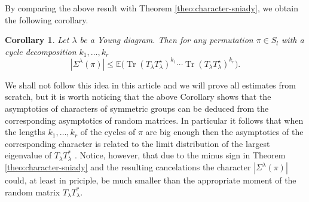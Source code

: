 \documentclass[12pt]{amsart}
\theoremstyle{plain}
\newtheorem{corollary}[lemma]{Corollary}
\theoremstyle{remark}
\newcommand{\E}{\mathbb{E}}
\newcommand{\gwia}{^\ast}
\DeclareMathOperator{\Tr}{Tr}
\begin{document}
By comparing the above result with Theorem \ref{theo:character-sniady}, we
obtain the following corollary.
\begin{corollary}
Let $\lambda$ be a Young diagram. 
Then for any permutation $\pi\in S_l$ with a cycle decomposition $k_1,\dots,k_r$
 $$|\Sigma^{\lambda}(\pi)| \leq  \E\big(\Tr(T_\lambda T_\lambda^\star)^{k_1}
\cdots \Tr(T_\lambda
T_\lambda^\star)^{k_r} \big).$$
\end{corollary}
We shall not follow this idea in this article and we will prove all estimates
from scratch, but it is worth noticing that the above Corollary shows that
the asymptotics of characters of symmetric groups can be deduced from the
corresponding asymptotics of random matrices. In particular it follows  that 
when the lengths $k_1,\dots,k_r$ of the cycles of $\pi$ are big enough then the
asymptotics of the corresponding character is related to the limit distribution
of the largest eigenvalue of $T_{\lambda}T\gwia_{\lambda}$
\cite{SinaiSoshnikov1998}. Notice, however, that due to the minus sign in
Theorem \ref{theo:character-sniady} and the resulting cancelations the 
character $|\Sigma^{\lambda}(\pi)|$ could, at least in priciple,  be much
smaller than the appropriate moment of the random matrix
$T_{\lambda}T_{\lambda}\gwia$.
\end{document}
